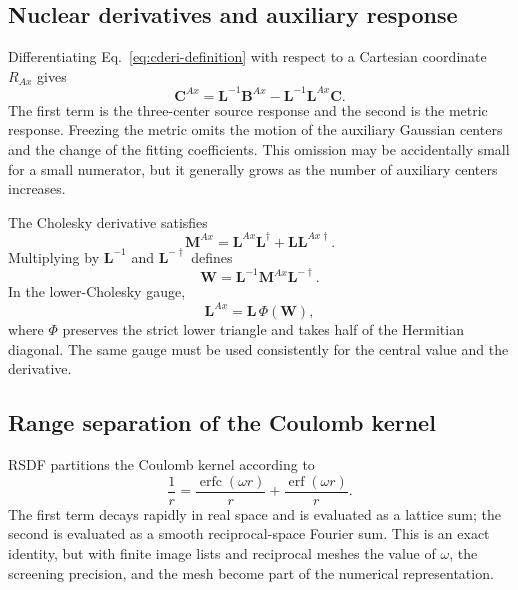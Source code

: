 \subsection{Nuclear derivatives and auxiliary response}

Differentiating Eq.~\eqref{eq:cderi-definition} with respect to a Cartesian
coordinate $R_{Ax}$ gives
\begin{equation}
  \mathbf C^{Ax}
  =\mathbf L^{-1}\mathbf B^{Ax}
  -\mathbf L^{-1}\mathbf L^{Ax}\mathbf C.
  \label{eq:cderi-response}
\end{equation}
The first term is the three-center source response and the second is the
metric response.  Freezing the metric omits the motion of the auxiliary
Gaussian centers and the change of the fitting coefficients.  This omission
may be accidentally small for a small numerator, but it generally grows as
the number of auxiliary centers increases.

The Cholesky derivative satisfies
\begin{equation}
  \mathbf M^{Ax}=\mathbf L^{Ax}\mathbf L^\dagger
  +\mathbf L\mathbf L^{Ax\dagger}.
  \label{eq:cholesky-response}
\end{equation}
Multiplying by $\mathbf L^{-1}$ and $\mathbf L^{-\dagger}$ defines
\begin{equation}
  \mathbf W=\mathbf L^{-1}\mathbf M^{Ax}\mathbf L^{-\dagger}.
\end{equation}
In the lower-Cholesky gauge,
\begin{equation}
  \mathbf L^{Ax}=\mathbf L\,\Phi(\mathbf W),
\end{equation}
where $\Phi$ preserves the strict lower triangle and takes half of the
Hermitian diagonal.  The same gauge must be used consistently for the central
value and the derivative.

\subsection{Range separation of the Coulomb kernel}

RSDF partitions the Coulomb kernel according to
\begin{equation}
  \frac{1}{r}
  =\frac{\operatorname{erfc}(\omega r)}{r}
  +\frac{\operatorname{erf}(\omega r)}{r}.
  \label{eq:range-separation}
\end{equation}
The first term decays rapidly in real space and is evaluated as a lattice sum;
the second is evaluated as a smooth reciprocal-space Fourier sum.  This is an
exact identity, but with finite image lists and reciprocal meshes the value of
$\omega$, the screening precision, and the mesh become part of the numerical
representation.

